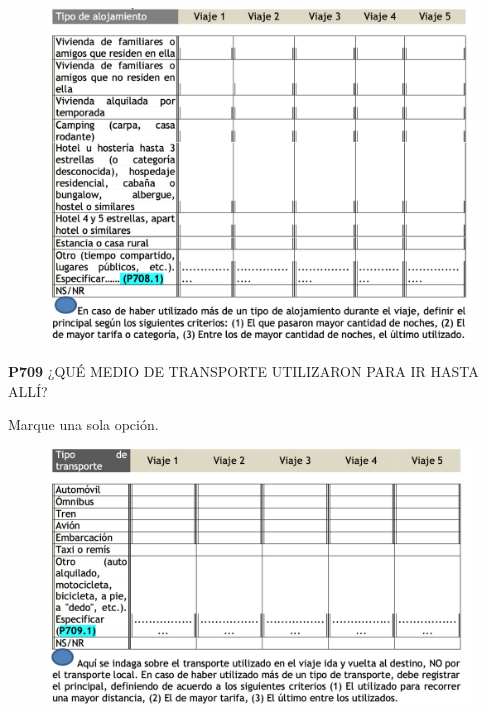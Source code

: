 \documentclass[
  openany]{book}
\begin{document}
\begin{figure}

{\centering \includegraphics[width=1\linewidth]{imagenes/figura6-242} 

}

\end{figure}

\textbf{P709} ¿QUÉ MEDIO DE TRANSPORTE UTILIZARON PARA IR HASTA ALLÍ?

Marque una sola opción.

\begin{figure}

{\centering \includegraphics[width=1\linewidth]{imagenes/figura6-243} 

}

\end{figure}
\end{document}
